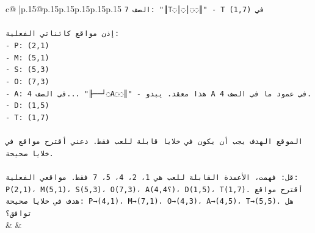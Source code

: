 \documentclass{article}
\begin{document}
{\begin{supertabular}{c@{$\;$}|p{.15\linewidth}@{}p{.15\linewidth}p{.15\linewidth}p{.15\linewidth}p{.15\linewidth}p{.15\linewidth}}
{{{\texttt{الصف 7: "║T◌│◌│◌◌║" {-} T في (1,7)} \\
\\ 
\texttt{إذن مواقع كائناتي الفعلية:} \\
\texttt{{-} P: (2,1)} \\
\texttt{{-} M: (5,1)} \\
\texttt{{-} S: (5,3)} \\
\texttt{{-} O: (7,3)} \\
\texttt{{-} A: في الصف 4... "╟──┘◌A◌◌║" {-} هذا معقد. يبدو A في عمود ما في الصف 4.} \\
\texttt{{-} D: (1,5)} \\
\texttt{{-} T: (1,7)} \\
\\ 
\texttt{الموقع الهدف يجب أن يكون في خلايا قابلة للعب فقط. دعني أقترح مواقع في خلايا صحيحة.} \\
\\ 
\texttt{قل: فهمت، الأعمدة القابلة للعب هي 1، 2، 4، 5، 7 فقط. مواقعي الفعلية: P(2,1)، M(5,1)، S(5,3)، O(7,3)، A(4,4؟)، D(1,5)، T(1,7). أقترح مواقع هدف في خلايا صحيحة: P→(4,1)، M→(7,1)، O→(4,3)، A→(4,5)، T→(5,5). هل توافق؟} \\
            }
        }
    }
    & & \\ \\


\end{supertabular}}
\end{document}
